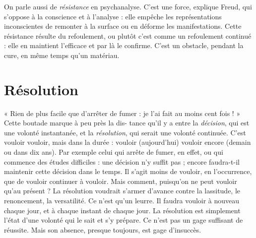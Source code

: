 On parle aussi de {\it résistance} en psychanalyse. C’est une force, explique
Freud, qui s'oppose à la conscience et à l’analyse : elle empêche les représentations
inconscientes de remonter à la surface ou en déforme les manifestations.
Cette résistance résulte du refoulement, ou plutôt c’est comme un refoulement
continué : elle en maintient l’efficace et par là le confirme. C’est un obstacle,
pendant la cure, en même temps qu’un matériau.

\section{Résolution}
« Rien de plus facile que d’arrêter de fumer : je l’ai fait au
moins cent fois ! » Cette boutade marque à peu près la dis-
tance qu’il y a entre la {\it décision}, qui est une volonté instantanée, et la {\it résolution},
qui serait une volonté continuée. C’est vouloir vouloir, mais dans la durée :
vouloir (aujourd’hui) vouloir encore (demain ou dans dix ans). Par exemple
celui qui arrête de fumer, en effet, ou qui commence des études difficiles : une
décision n’y suffit pas ; encore faudra-t-il maintenir cette décision dans le
temps. Il s’agit moins de vouloir, en l’occurrence, que de vouloir continuer à
vouloir. Mais comment, puisqu'on ne peut vouloir qu’au présent ? La résolution
voudrait s’armer d’avance contre la lassitude, le renoncement, la versatilité.
Ce n’est qu’un leurre. Il faudra vouloir à nouveau chaque jour, et à chaque instant
de chaque jour. La résolution est simplement l’état d’une volonté qui le
sait et s’y prépare. Ce n’est pas un gage suffisant de réussite. Mais son absence,
presque toujours, est gage d’insuccès.

